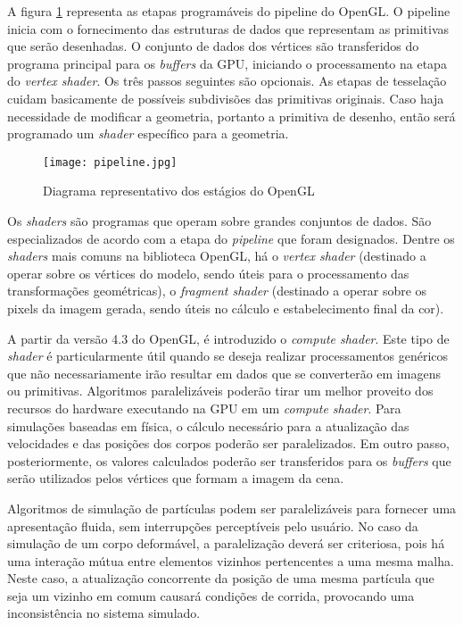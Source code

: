 A figura \ref{fig:pipeline} representa as etapas programáveis do pipeline do OpenGL. O pipeline inicia com o fornecimento das estruturas de dados que representam as primitivas que serão desenhadas. O conjunto de dados dos vértices são transferidos do programa principal para os \textit{buffers} da \acs{GPU}, iniciando o processamento na etapa do \textit{vertex shader}. Os três passos seguintes são opcionais. As etapas de tesselação cuidam basicamente de possíveis subdivisões das primitivas originais. Caso haja necessidade de modificar a geometria, portanto a primitiva de desenho, então será programado um \textit{shader} específico para a geometria. 

\begin{figure}
\begin{center}
\texttt{[image: pipeline.jpg]}
\caption{Diagrama representativo dos estágios do \ac{OpenGL} \cite{Shreiner:2013:OPG:2544032}}
\label{fig:pipeline}
\end{center} 
\end{figure}

Os \textit{shaders} são programas que operam sobre grandes conjuntos de dados. São especializados de acordo com a etapa do \textit{pipeline} que foram designados. Dentre os \textit{shaders} mais comuns na biblioteca OpenGL, há o \textit{vertex shader} (destinado a operar sobre os vértices do modelo, sendo úteis para o processamento das transformações geométricas), o \textit{fragment shader} (destinado a operar sobre os pixels da imagem gerada, sendo úteis no cálculo e estabelecimento final da cor).

A partir da versão 4.3 do \acs{OpenGL}, é introduzido o \textit{compute shader}. Este tipo de \textit{shader} é particularmente útil quando se deseja realizar processamentos genéricos que não necessariamente irão resultar em dados que se converterão em imagens ou primitivas. Algoritmos paralelizáveis poderão tirar um melhor proveito dos recursos do hardware executando na \acs{GPU} em um \textit{compute shader}. Para simulações baseadas em física, o cálculo necessário para a atualização das velocidades e das posições dos corpos poderão ser paralelizados. Em outro passo, posteriormente, os valores calculados poderão ser transferidos para os \textit{buffers} que serão utilizados pelos vértices que formam a imagem da cena.

Algoritmos de simulação de partículas podem ser paralelizáveis para fornecer uma apresentação fluida, sem interrupções perceptíveis pelo usuário. No caso da simulação de um corpo deformável, a paralelização deverá ser criteriosa, pois há uma interação mútua entre elementos vizinhos pertencentes a uma mesma malha. Neste caso, a atualização concorrente da posição de uma mesma partícula que seja um vizinho em comum causará condições de corrida, provocando uma inconsistência no sistema simulado. 

